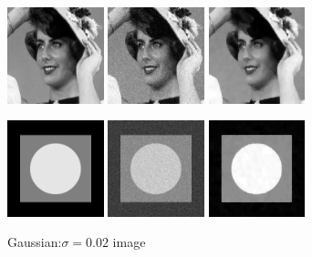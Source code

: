 \documentclass[notheorems,mathserif,table,compress]{beamer}  %
\begin{document}
%
\begin{frame}
\begin{figure}[!ht]
\begin{minipage}[t]{0.5\textwidth}
\centering
\includegraphics[width=1.1in]{imgs/Lena.png}
\includegraphics[width=1.1in]{imgs/Lenanoise.png}
\includegraphics[width=1.1in]{imgs/Lenadenoise11.png}
\caption{Gaussian:$\sigma=0.02$ image}
\label{1:2}
\end{minipage}
\begin{minipage}[t]{0.5\textwidth}
\centering
\includegraphics[width=1.1in]{imgs/gaussian-original.png}
\includegraphics[width=1.1in]{imgs/gaussian-noise.png}
\includegraphics[width=1.1in]{imgs/gaussian-denoise11.png}
\end{minipage}
\end{figure} 
\end{frame}
\end{document}
